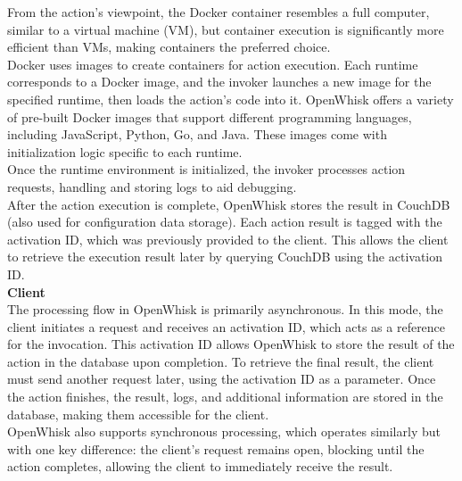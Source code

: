From the action’s viewpoint, the Docker container resembles a full computer, similar to a virtual machine (VM), but container execution is significantly more efficient than VMs, making containers the preferred choice.\\
Docker uses images to create containers for action execution. Each runtime corresponds to a Docker image, and the invoker launches a new image for the specified runtime, then loads the action’s code into it. OpenWhisk offers a variety of pre-built Docker images that support different programming languages, including JavaScript, Python, Go, and Java. These images come with initialization logic specific to each runtime.\\
Once the runtime environment is initialized, the invoker processes action requests, handling and storing logs to aid debugging.\vspace{14pt}\\
After the action execution is complete, OpenWhisk stores the result in CouchDB (also used for configuration data storage). Each action result is tagged with the activation ID, which was previously provided to the client. This allows the client to retrieve the execution result later by querying CouchDB using the activation ID.\vspace{14pt}\\
\textbf{Client}\\
The processing flow in OpenWhisk is primarily asynchronous. In this mode, the client initiates a request and receives an activation ID, which acts as a reference for the invocation. This activation ID allows OpenWhisk to store the result of the action in the database upon completion. To retrieve the final result, the client must send another request later, using the activation ID as a parameter. Once the action finishes, the result, logs, and additional information are stored in the database, making them accessible for the client.\vspace{14pt}\\
OpenWhisk also supports synchronous processing, which operates similarly but with one key difference: the client’s request remains open, blocking until the action completes, allowing the client to immediately receive the result.\cite{sciabarra2019learning}